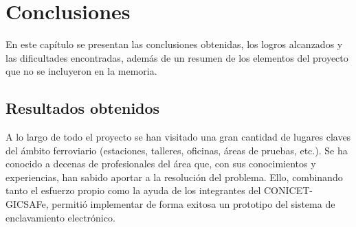 
\chapter{Conclusiones} %

\label{Chapter5} %


En este capítulo se presentan las conclusiones obtenidas, los logros alcanzados y las dificultades encontradas, además de un resumen de los elementos del proyecto que no se incluyeron en la memoria.


\section{Resultados obtenidos}
	
	A lo largo de todo el proyecto se han visitado una gran cantidad de lugares claves del ámbito ferroviario (estaciones, talleres, oficinas, áreas de pruebas, etc.). Se ha conocido a decenas de profesionales del área que, con sus conocimientos y experiencias, han sabido aportar a la resolución del problema. Ello, combinando tanto el esfuerzo propio como la ayuda de los integrantes del CONICET-GICSAFe, permitió implementar de forma exitosa un prototipo del sistema de enclavamiento electrónico.
	
	
		
